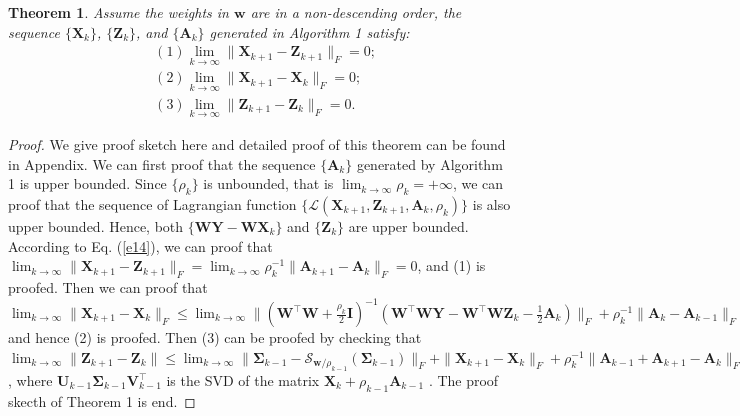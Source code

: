 \documentclass[10pt,twocolumn,letterpaper,sort&compress]{article}
\newtheorem{theorem}{Theorem}
\begin{document}
\begin{theorem}
Assume the weights in $\bm{w}$ are in a non-descending order, the sequence $\{\mathbf{X}_{k}\}$, $\{\mathbf{Z}_{k}\}$, and $\{\mathbf{A}_{k}\}$ generated in Algorithm 1 satisfy:
\begin{align}
&(1) \lim_{k \to \infty} \|\mathbf{X}_{k+1}-\mathbf{Z}_{k+1}\|_{F}=0;
\\
&(2) \lim_{k \to \infty} \|\mathbf{X}_{k+1}-\mathbf{X}_{k}\|_{F}=0;
\\
&(3) \lim_{k \to \infty} \|\mathbf{Z}_{k+1}-\mathbf{Z}_{k}\|_{F}=0.
\end{align}
\end{theorem}
\begin{proof}
We give proof sketch here and detailed proof of this theorem can be found in Appendix. We can first proof that the sequence $\{\mathbf{A}_{k}\}$ generated by Algorithm 1 is upper bounded. Since $\{\rho_{k}\}$ is unbounded, that is $\lim_{k\to\infty}{\rho_{k}}=+\infty$, we can proof that the sequence of Lagrangian function $\{\mathcal{L}(\mathbf{X}_{k+1},\mathbf{Z}_{k+1},\mathbf{A}_{k},\rho_{k})\}$ is also upper bounded. 
Hence, both $\{\mathbf{W}\mathbf{Y}-\mathbf{W}\mathbf{X}_{k}\}$ and $\{\mathbf{Z}_{k}\}$ are upper bounded. According to Eq. (\ref{e14}), we can proof that 
$
\lim_{k \to \infty} 
\|
\mathbf{X}_{k+1}
-
\mathbf{Z}_{k+1}
\|_{F}
=
\lim_{k \to \infty} 
\rho_{k}^{-1}
\|
\mathbf{A}_{k+1}
-
\mathbf{A}_{k}
\|_{F}
=
0
$,
and (1) is proofed. Then we can proof that 
$
\lim_{k \to \infty} 
\|
\mathbf{X}_{k+1}
-
\mathbf{X}_{k}
\|_{F}
\le
\lim_{k \to \infty} 
\|
(\mathbf{W}^{\top}\mathbf{W}
+
\frac{\rho_{k}}{2}
\mathbf{I})^{-1}
(\mathbf{W}^{\top}\mathbf{W}\mathbf{Y}
-
\mathbf{W}^{\top}\mathbf{W}\mathbf{Z}_{k}
-
\frac{1}{2}
\mathbf{A}_{k})
\|_{F}
+
\rho_{k}^{-1}\|
\mathbf{A}_{k}-\mathbf{A}_{k-1}
\|_{F}
=
0
$
and hence (2) is proofed. Then (3) can be proofed by checking that 
$
\lim_{k \to \infty} \|\mathbf{Z}_{k+1}-\mathbf{Z}_{k}\|
\le
\lim_{k \to \infty} 
\|
\mathbf{\Sigma}_{k-1}-\mathcal{S}_{\bm{w}/\rho_{k-1}}(\mathbf{\Sigma}_{k-1})
\|_{F}
+
\|
\mathbf{X}_{k+1}-\mathbf{X}_{k}
\|_{F}
+
\rho_{k}^{-1}
\|
\mathbf{A}_{k-1}
+
\mathbf{A}_{k+1}
-
\mathbf{A}_{k}
\|_{F}
=
0
$
,
where $\mathbf{U}_{k-1}\mathbf{\Sigma}_{k-1}\mathbf{V}_{k-1}^{\top}$ is the SVD of the matrix $\mathbf{X}_{k}+\rho_{k-1}\mathbf{A}_{k-1}$
.
The proof skecth of Theorem 1 is end.
\end{proof}
\end{document}
